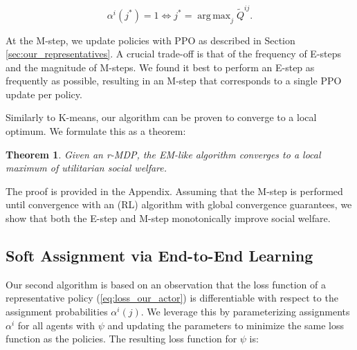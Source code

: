 \documentclass[letterpaper]{article} %
\DeclareMathOperator*{\argmax}{arg\,max}
\DeclareMathOperator*{\clip}{clip}
\newtheorem{theorem}{Theorem}
\begin{document}
\begin{equation}\label{eq:hard_E_step}
    \alpha^i(j^*) = 1 \iff j^* = \argmax_j \tilde{Q}^{ij}.
\end{equation}



At the M-step, we update policies with PPO as described in Section \ref{sec:our_representatives}. A crucial trade-off is that of the frequency of E-steps and the magnitude of M-steps. We found it best to perform an E-step as frequently as possible, resulting in an M-step that corresponds to a single PPO update per policy.


Similarly to K-means, our algorithm can be proven to converge to a local optimum. We formulate this as a theorem:

\begin{theorem}\label{theorem}
    Given an r-MDP, the EM-like algorithm converges to a local maximum of utilitarian social welfare. 
\end{theorem}

\noindent The proof is provided in the Appendix. Assuming that the M-step is performed until convergence with an (RL) algorithm with global convergence guarantees, we show that both the E-step and M-step monotonically improve social welfare.





\subsection{Soft Assignment via End-to-End Learning}\label{sec:our_soft}

Our second algorithm is based on an observation that the loss function of a representative policy (\ref{eq:loss_our_actor}) is differentiable with respect to the assignment probabilities $\alpha^i(j)$. We leverage this by parameterizing assignments $\alpha^i$ for all agents with $\psi$ and updating the parameters to minimize the same loss function as the policies. The resulting loss function for $\psi$ is:

\end{document}
